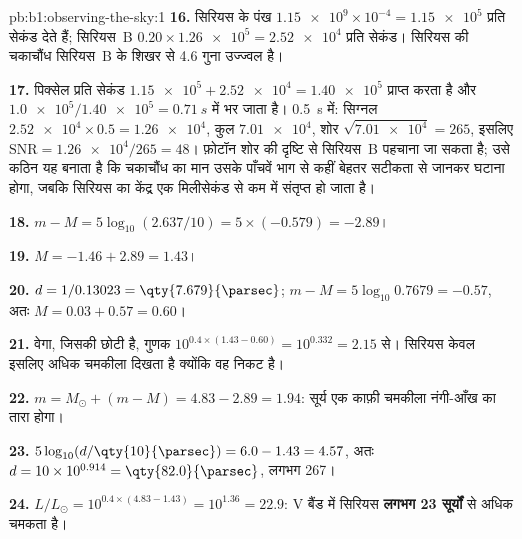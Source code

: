 \begin{solution}{pb:b1:observing-the-sky:1}
\textbf{16.} सिरियस के पंख $\num{1.15e9}\times10^{-4} =
\num{1.15e5}$ प्रति सेकंड देते हैं; सिरियस~B $0.20\times\num{1.26e5} =
\num{2.52e4}$ प्रति सेकंड। सिरियस की चकाचौंध सिरियस~B के शिखर से 4.6 गुना उज्ज्वल है।

\textbf{17.} पिक्सेल प्रति सेकंड $\num{1.15e5} + \num{2.52e4} = \num{1.40e5}$ प्राप्त करता है और
$\num{1.0e5}/\num{1.40e5} = \qty{0.71}{s}$ में भर जाता है। \qty{0.5}{s} में: सिग्नल
$\num{2.52e4}\times0.5 = \num{1.26e4}$, कुल
$\num{7.01e4}$, शोर $\sqrt{\num{7.01e4}} = 265$, इसलिए $\mathrm{SNR} =
\num{1.26e4}/265 = 48$। फ़ोटॉन शोर की दृष्टि से सिरियस~B पहचाना जा सकता है; उसे कठिन यह बनाता है
कि चकाचौंध का मान उसके पाँचवें भाग से कहीं बेहतर सटीकता से जानकर घटाना होगा, जबकि सिरियस का केंद्र
एक मिलीसेकंड से कम में संतृप्त हो जाता है।

\textbf{18.} $m - M = 5\log_{10}(2.637/10) = 5\times(-0.579) = -2.89$।

\textbf{19.} $M = -1.46 + 2.89 = 1.43$।

\textbf{20.} $d = 1/0.13023 = \qty{7.679}{\parsec}$;
$m - M = 5\log_{10}0.7679 = -0.57$, अतः $M = 0.03 + 0.57 = 0.60$।

\textbf{21.} वेगा, जिसकी  छोटी है, गुणक
$10^{0.4\times(1.43 - 0.60)} = 10^{0.332} = 2.15$ से। सिरियस केवल इसलिए अधिक चमकीला दिखता है क्योंकि वह निकट है।

\textbf{22.} $m = M_\odot + (m - M) = 4.83 - 2.89 = 1.94$: सूर्य एक काफ़ी चमकीला नंगी-आँख का तारा होगा।

\textbf{23.} $5\log_{10}(d/\qty{10}{\parsec}) = 6.0 - 1.43 = 4.57$, अतः
$d = 10\times10^{0.914} = \qty{82.0}{\parsec}$, लगभग \qty{267}{\lightyear}।

\textbf{24.} $L/L_\odot = 10^{0.4\times(4.83 - 1.43)} = 10^{1.36} = 22.9$:
V बैंड में सिरियस \textbf{लगभग 23 सूर्यों} से अधिक चमकता है।
\end{solution}
